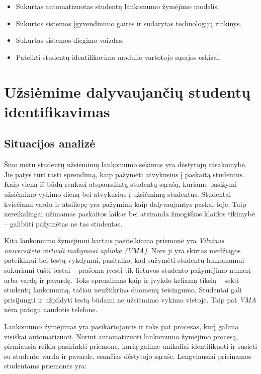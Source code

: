\documentclass{VUMIFPSkursinis}
\begin{document}

\begin{itemize}
	\item Sukurtas automatizuotas studentų lankomumo žymėjimo modelis.
	\item Sukurtos sistemos įgyvendinimo gairės ir sudarytas technologijų rinkinys.
	\item Sukurtas sistemos diegimo vaizdas.
	\item Pateikti studentų identifikavimo modulio vartotojo sąsajos eskizai.
\end{itemize}

\section{Užsiėmime dalyvaujančių studentų identifikavimas}

\subsection{Situacijos analizė}

Šiuo metu studentų užsiėmimų lankomumo sekimas yra dėstytojų atsakomybė. Jie patys turi rasti sprendimą, kaip pažymėti atvykusius į paskaitą studentus. Kaip vieną iš būdų renkasi atspausdintą studentų sąrašą, kuriame pasižymi užsiėmimo vykimo dieną bei atvykusius į užsiėmimą studentus. Studentai kviečiami vardu ir atsiliepę yra pažymimi kaip dalyvaujantys paskai-toje. Taip nereikalingai užimamas paskaitos laikas bei atsiranda žmogiškos klaidos tikimybė – galibūti pažymėtas ne tas studentas.

Kita lankomumo žymėjimui kartais pasitelkiama priemonė yra \textit{Vilniaus universiteto virtuali mokymosi aplinka (VMA)}. Nors ji yra skirtas medžiagos pateikimui bei testų vykdymui, pasitaiko, kad sužymėti studentų lankomumui sukuriami tušti testai – prašoma įvesti tik lietuvos studento pažymėjimo numerį arba vardą ir pavardę. Toks sprendimas kaip ir įvykdo keliamą tikslą – sekti studentų lankomumą, tačiau neužtikrina duomenų teisingumo. Studentai gali prisijungti ir užpildyti testą būdami ne užsiėmimo vykimo vietoje. Taip pat \textit{VMA} nėra patogu naudotis telefone.

Lankomumo žymėjimas yra pasikartojantis ir toks pat procesas, kurį galima visiškai automatizuoti. Norint automatizuoti lankomumo žymėjimo procesą, pirmiausia reikia pasirinkti priemonę, kurią galime unikaliai identifikuoti ir susieti su studento vardu ir pavarde, esančias dėstytojo sąraše. Lengviausiai prieinamos studentams priemonės yra:
\end{document}
